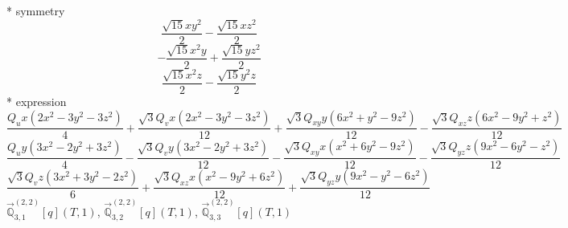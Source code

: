 \documentclass[fleqn,8pt]{jsarticle}
\begin{document}
\noindent\quad ** symmetry
\begin{dmath*}
\frac{\sqrt{15} x y^{2}}{2} - \frac{\sqrt{15} x z^{2}}{2}
\end{dmath*}
\begin{dmath*}
- \frac{\sqrt{15} x^{2} y}{2} + \frac{\sqrt{15} y z^{2}}{2}
\end{dmath*}
\begin{dmath*}
\frac{\sqrt{15} x^{2} z}{2} - \frac{\sqrt{15} y^{2} z}{2}
\end{dmath*}
\noindent\quad ** expression
\begin{dmath*}
\frac{Q_{u} x \left(2 x^{2} - 3 y^{2} - 3 z^{2}\right)}{4} + \frac{\sqrt{3} Q_{v} x \left(2 x^{2} - 3 y^{2} - 3 z^{2}\right)}{12} + \frac{\sqrt{3} Q_{xy} y \left(6 x^{2} + y^{2} - 9 z^{2}\right)}{12} - \frac{\sqrt{3} Q_{xz} z \left(6 x^{2} - 9 y^{2} + z^{2}\right)}{12}
\end{dmath*}
\begin{dmath*}
\frac{Q_{u} y \left(3 x^{2} - 2 y^{2} + 3 z^{2}\right)}{4} - \frac{\sqrt{3} Q_{v} y \left(3 x^{2} - 2 y^{2} + 3 z^{2}\right)}{12} - \frac{\sqrt{3} Q_{xy} x \left(x^{2} + 6 y^{2} - 9 z^{2}\right)}{12} - \frac{\sqrt{3} Q_{yz} z \left(9 x^{2} - 6 y^{2} - z^{2}\right)}{12}
\end{dmath*}
\begin{dmath*}
\frac{\sqrt{3} Q_{v} z \left(3 x^{2} + 3 y^{2} - 2 z^{2}\right)}{6} + \frac{\sqrt{3} Q_{xz} x \left(x^{2} - 9 y^{2} + 6 z^{2}\right)}{12} + \frac{\sqrt{3} Q_{yz} y \left(9 x^{2} - y^{2} - 6 z^{2}\right)}{12}
\end{dmath*}
\noindent\quad $\vec{\mathbb{Q}}_{3,1}^{(2,2)}[q](T,1)$, $\vec{\mathbb{Q}}_{3,2}^{(2,2)}[q](T,1)$, $\vec{\mathbb{Q}}_{3,3}^{(2,2)}[q](T,1)$
\end{document}
